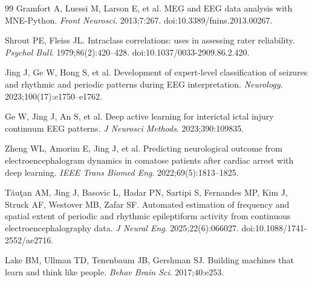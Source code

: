 \documentclass{iopjournal}
\begin{document}
\begin{thebibliography}{99}
Gramfort A, Luessi M, Larson E, et al.
MEG and EEG data analysis with MNE-Python.
\textit{Front Neurosci}. 2013;7:267. doi:10.3389/fnins.2013.00267.

Shrout PE, Fleiss JL.
Intraclass correlations: uses in assessing rater reliability.
\textit{Psychol Bull}. 1979;86(2):420--428. doi:10.1037/0033-2909.86.2.420.

Jing J, Ge W, Hong S, et al.
Development of expert-level classification of seizures and rhythmic and periodic patterns during EEG interpretation.
\textit{Neurology}. 2023;100(17):e1750--e1762.

Ge W, Jing J, An S, et al.
Deep active learning for interictal ictal injury continuum EEG patterns.
\textit{J Neurosci Methods}. 2023;390:109835.

Zheng WL, Amorim E, Jing J, et al.
Predicting neurological outcome from electroencephalogram dynamics in comatose patients after cardiac arrest with deep learning.
\textit{IEEE Trans Biomed Eng}. 2022;69(5):1813--1825.

T\u{a}u\c{t}an AM, Jing J, Basovic L, Hadar PN, Sartipi S, Fernandes MP, Kim J, Struck AF, Westover MB, Zafar SF.
Automated estimation of frequency and spatial extent of periodic and rhythmic epileptiform activity from continuous electroencephalography data.
\textit{J Neural Eng}. 2025;22(6):066027. doi:10.1088/1741-2552/ae2716.

Lake BM, Ullman TD, Tenenbaum JB, Gershman SJ.
Building machines that learn and think like people.
\textit{Behav Brain Sci}. 2017;40:e253.

\end{thebibliography}
\end{document}
